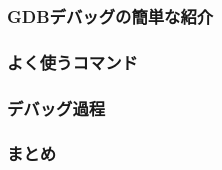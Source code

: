 
\subsubsection{GDBデバッグの簡単な紹介}

\subsubsection{よく使うコマンド}

\subsubsection{デバッグ過程}

\subsubsection{まとめ}


